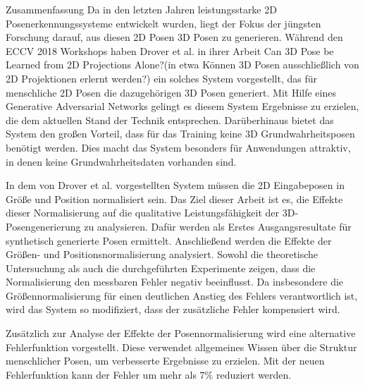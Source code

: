 \pagebreak
{}
\begin{polyabstract}{Zusammenfassung}
	Da in den letzten Jahren leistungsstarke 2D Posenerkennungssysteme entwickelt wurden, liegt der Fokus der jüngsten Forschung darauf, aus diesen 2D Posen 3D Posen zu generieren.
	Während den ECCV 2018 Workshops haben Drover et al. in ihrer Arbeit \glqq Can 3D Pose be Learned from 2D Projections Alone?\grqq (in etwa \glqq Können 3D Posen ausschließlich von 2D Projektionen erlernt werden?\grqq) ein solches System vorgestellt, das für menschliche 2D Posen die dazugehörigen 3D Posen generiert.
	Mit Hilfe eines Generative Adversarial Networks gelingt es diesem System Ergebnisse zu erzielen, die dem aktuellen Stand der Technik entsprechen.
	Darüberhinaus bietet das System den großen Vorteil, dass für das Training keine 3D Grundwahrheitsposen benötigt werden.
	Dies macht das System besonders für Anwendungen attraktiv, in denen keine Grundwahrheitsdaten vorhanden sind.
	
	In dem von Drover et al. vorgestellten System müssen die 2D Eingabeposen in Größe und Position normalisiert sein.
	Das Ziel dieser Arbeit ist es, die Effekte dieser Normalisierung auf die qualitative Leistungsfähigkeit der 3D-Posengenerierung zu analysieren.
	Dafür werden als Erstes Ausgangsresultate für synthetisch generierte Posen ermittelt.
	Anschließend werden die Effekte der Größen- und Positionsnormalisierung analysiert.
	Sowohl die theoretische Untersuchung als auch die durchgeführten Experimente zeigen, dass die Normalisierung den messbaren Fehler negativ beeinflusst.
	Da insbesondere die Größennormalisierung für einen deutlichen Anstieg des Fehlers verantwortlich ist, wird das System so modifiziert, dass der zusätzliche Fehler kompensiert wird.
	
	Zusätzlich zur Analyse der Effekte der Posennormalisierung wird eine alternative Fehlerfunktion vorgestellt.
	Diese verwendet allgemeines Wissen über die Struktur menschlicher Posen, um verbesserte Ergebnisse zu erzielen.
	Mit der neuen Fehlerfunktion kann der Fehler um mehr als $7\%$ reduziert werden. 
\end{polyabstract}

